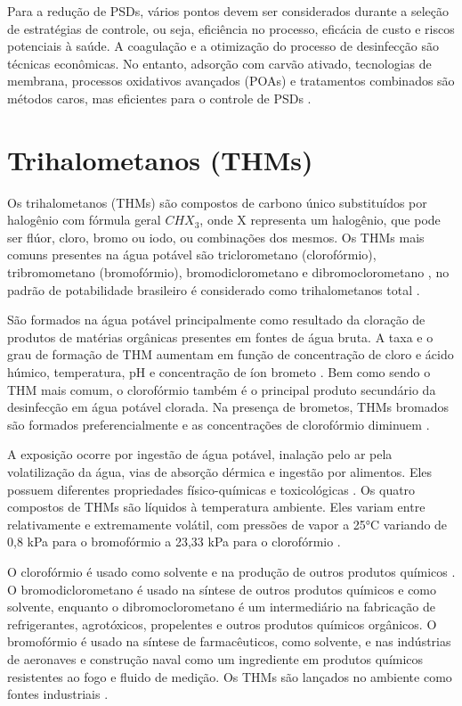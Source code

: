 Para a redução de PSDs, vários pontos devem ser considerados durante a seleção de estratégias de controle, ou seja, eficiência no processo, eficácia de custo e riscos potenciais à saúde. A coagulação e a otimização do processo de desinfecção são técnicas econômicas. No entanto, adsorção com carvão ativado, tecnologias de membrana, processos oxidativos avançados (POAs) e tratamentos combinados são métodos caros, mas eficientes para o controle de PSDs \cite{Kali2021}.




\section{Trihalometanos (THMs)}

Os trihalometanos (THMs) são compostos de carbono único substituídos por halogênio com fórmula geral $CHX_3$, onde X representa um halogênio, que pode ser flúor, cloro, bromo ou iodo, ou combinações dos mesmos. Os THMs mais comuns presentes na água potável são triclorometano (clorofórmio), tribromometano (bromofórmio), bromodiclorometano e dibromoclorometano \cite{who2005}, no padrão de potabilidade brasileiro é considerado como trihalometanos total \cite{AnexoXX}. 

São formados na água potável principalmente como resultado da cloração de produtos de matérias orgânicas presentes em fontes de água bruta. A taxa e o grau de formação de THM aumentam em função de concentração de cloro e ácido húmico, temperatura, pH e concentração de íon brometo \cite{stevens1976}. Bem como sendo o THM mais comum, o clorofórmio também é o principal produto secundário da desinfecção em água potável clorada. Na presença de brometos, THMs bromados são formados preferencialmente e as concentrações de clorofórmio diminuem \cite{saidan2016effect}.

A exposição ocorre por ingestão de água potável, inalação pelo ar pela volatilização da água, vias de absorção dérmica e ingestão por alimentos. Eles possuem diferentes propriedades físico-químicas e toxicológicas \cite{villanueva}. Os quatro compostos de THMs são líquidos à temperatura ambiente. Eles variam entre relativamente e extremamente volátil, com pressões de vapor a 25°C variando de 0,8 kPa para o bromofórmio a 23,33 kPa para o clorofórmio \cite{who2005}. 

O clorofórmio é usado como solvente e na produção de outros produtos químicos \cite{who2004}. O bromodiclorometano é usado na síntese de outros produtos químicos e como solvente, enquanto o dibromoclorometano é um intermediário na fabricação de refrigerantes, agrotóxicos, propelentes e outros produtos químicos orgânicos. O bromofórmio é usado na síntese de farmacêuticos, como solvente, e nas indústrias de aeronaves e construção naval como um ingrediente em produtos químicos resistentes ao fogo e fluido de medição. Os THMs são lançados no ambiente como fontes industriais \cite{who2005}.

